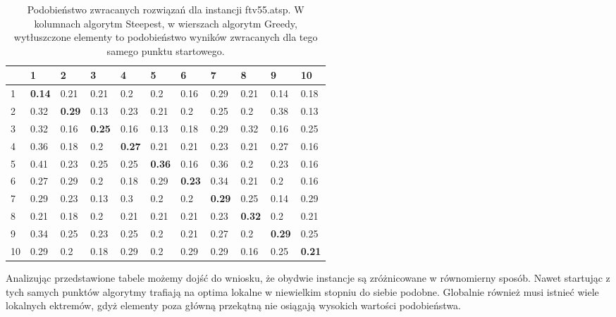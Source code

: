 \begin{table}[h!]
       \centering
       \begin{tabular}{|l|l|l|l|l|l|l|l|l|l|l|}
        \hline
		& 1 & 2 & 3 & 4 & 5 & 6 & 7 & 8 & 9 & 10 \\
		\hline
		1 & \textbf{0.14} & 0.21 & 0.21 & 0.2 & 0.2 & 0.16 & 0.29 & 0.21 & 0.14 & 0.18 \\
		2 & 0.32 & \textbf{0.29} & 0.13 & 0.23 & 0.21 & 0.2 & 0.25 & 0.2 & 0.38 & 0.13 \\   
		3 & 0.32 & 0.16 & \textbf{0.25} & 0.16 & 0.13 & 0.18 & 0.29 & 0.32 & 0.16 & 0.25 \\   
		4 & 0.36 & 0.18 & 0.2 & \textbf{0.27} & 0.21 & 0.21 & 0.23 & 0.21 & 0.27 & 0.16 \\   
		5 & 0.41 & 0.23 & 0.25 & 0.25 & \textbf{0.36} & 0.16 & 0.36 & 0.2 & 0.23 & 0.16 \\   
		6 & 0.27 & 0.29 & 0.2 & 0.18 & 0.29 & \textbf{0.23} & 0.34 & 0.21 & 0.2 & 0.16 \\   
		7 & 0.29 & 0.23 & 0.13 & 0.3 & 0.2 & 0.2 & \textbf{0.29} & 0.25 & 0.14 & 0.29 \\   
		8 & 0.21 & 0.18 & 0.2 & 0.21 & 0.21 & 0.21 & 0.23 & \textbf{0.32} & 0.2 & 0.21 \\   
		9 & 0.34 & 0.25 & 0.23 & 0.25 & 0.2 & 0.21 & 0.27 & 0.2 & \textbf{0.29} & 0.25 \\   
		10 & 0.29 & 0.2 & 0.18 & 0.29 & 0.2 & 0.29 & 0.29 & 0.16 & 0.25 & \textbf{0.21} \\
		\hline
		\end{tabular}
		\caption{Podobieństwo zwracanych rozwiązań dla instancji ftv55.atsp. W kolumnach algorytm Steepest, w wierszach algorytm Greedy, wytłuszczone elementy to podobieństwo wyników zwracanych dla tego samego punktu startowego.}
		\label{tab:sim_55}
\end{table}

Analizując przedstawione tabele możemy dojść do wniosku, że obydwie instancje są zróżnicowane w równomierny sposób. Nawet startując z tych samych punktów algorytmy trafiają na optima lokalne w niewielkim stopniu do siebie podobne. Globalnie również musi istnieć wiele lokalnych ektremów, gdyż elementy poza główną przekątną nie osiągają wysokich wartości podobieństwa.